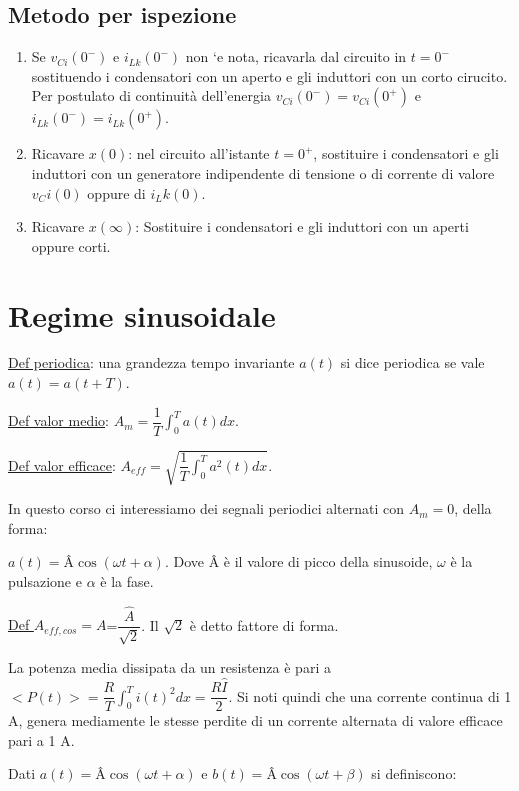 \documentclass{article}
\begin{document}
\subsection{Metodo per ispezione}
\begin{enumerate}
    \item Se $v_{Ci}(0^-)$ e $i_{Lk}(0^-)$ non `e nota, ricavarla dal circuito in $t = 0^{-}$ sostituendo
    i condensatori con un aperto e gli induttori con un corto cirucito. Per postulato di continuità dell'energia $v_{Ci}(0^-)=v_{Ci}(0^+)$ e
     $i_{Lk}(0^-)=i_{Lk}(0^+)$.
    \item Ricavare $x(0)$: nel circuito all'istante $t = 0^+$, sostituire i condensatori e gli induttori con
    un generatore indipendente di tensione o di corrente di valore $v_Ci(0)$ oppure di $i_Lk(0)$.
    \item Ricavare $x(\infty)$: Sostituire i condensatori e gli induttori con un aperti oppure  corti.
\end{enumerate}

\section{Regime sinusoidale}
\noindent \underline{Def periodica}: una grandezza tempo invariante $a(t)$ si dice periodica se vale $a(t)=a(t+T)$.

\noindent \underline{Def valor medio}: $A_m=\dfrac{1}{T}\int_{0}^{T} a(t)dx $.

\noindent \underline{Def valor efficace}: $A_{eff}=\sqrt{\dfrac{1}{T}\int_{0}^{T} a^2(t)dx }$.
\medskip

\noindent In questo corso ci interessiamo dei segnali periodici alternati con $A_m=0$, della forma: 
\medskip

\noindent $a(t)=$\^{A}$\cos(\omega t+\alpha)$. Dove \^{A} è il valore di picco della sinusoide, $\omega$ è la pulsazione e
$\alpha$ è la fase.

\noindent \underline{Def $A_{eff,cos}=A$}=$\dfrac{\hat{A}}{\sqrt{2}}$. Il $\sqrt{2}$ è detto fattore di forma.

\noindent La potenza media dissipata da un resistenza è pari a $<P(t)>=\dfrac{R}{T}\int_{0}^{T} i(t)^2dx=\dfrac{R\hat{I}}{2}$. Si noti 
quindi che una corrente continua di 1 A, genera mediamente le stesse perdite di un corrente alternata di valore efficace pari a 1 A.
\medskip

\noindent Dati $a(t)=$\^{A}$\cos(\omega t+\alpha)$ e $b(t)=$\^{A}$\cos(\omega t+\beta)$ si definiscono:
\medskip
\end{document}
